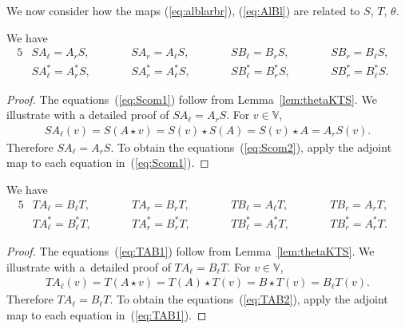 We now consider how the maps (\ref{eq:alblarbr}), (\ref{eq:AlBl}) are related to $S$, $T$, $\theta$.
\begin{Lemma}\label{lem:SAB}
We have
\begin{alignat}{5}
& S A_\ell = A_r S, \qquad&&
 S A_r = A_\ell S, \qquad&&
 S B_\ell = B_r S, \qquad&&
 S B_r = B_\ell S,&\label{eq:Scom1}\\
& S A^*_\ell = A^*_r S, \qquad &&
 S A^*_r = A^*_\ell S, \qquad &&
 S B^*_\ell = B^*_r S, \qquad &&
 S B^*_r = B^*_\ell S.&\label{eq:Scom2}
\end{alignat}
\end{Lemma}
\begin{proof} The equations~(\ref{eq:Scom1}) follow from Lemma~\ref{lem:thetaKTS}. We illustrate with a detailed proof of
$S A_{\ell} = A_r S$. For $v \in \mathbb V$,
\begin{gather*}
S A_{\ell}(v) = S(A \star v) = S(v)\star S(A) = S(v) \star A = A_r S(v).
\end{gather*}
Therefore $S A_{\ell} = A_r S$. To obtain the equations~(\ref{eq:Scom2}), apply the adjoint map to each equation in~(\ref{eq:Scom1}).
\end{proof}

\begin{Lemma}\label{lem:TAB} We have
\begin{alignat}{5}
\label{eq:TAB1}
& T A_\ell = B_\ell T, \qquad &&
 T A_r = B_r T, \qquad &&
 T B_\ell = A_\ell T, \qquad &&
 T B_r = A_r T,&\\
\label{eq:TAB2}
& T A^*_\ell = B^*_\ell T, \qquad &&
 T A^*_r = B^*_r T, \qquad &&
 T B^*_\ell = A^*_\ell T, \qquad &&
 T B^*_r = A^*_r T.
\end{alignat}
\end{Lemma}
\begin{proof} The equations~(\ref{eq:TAB1}) follow from Lemma~\ref{lem:thetaKTS}. We illustrate with a~detailed proof of $T A_\ell = B_\ell T$. For $v \in \mathbb V$,
\begin{gather*}
T A_\ell (v) =
T(A \star v) =
T(A) \star T(v) =
B \star T(v) =
B_\ell T (v).
\end{gather*}
Therefore
$T A_\ell = B_\ell T$. To obtain the equations~(\ref{eq:TAB2}), apply the adjoint map to each equation in~(\ref{eq:TAB1}).
\end{proof}

